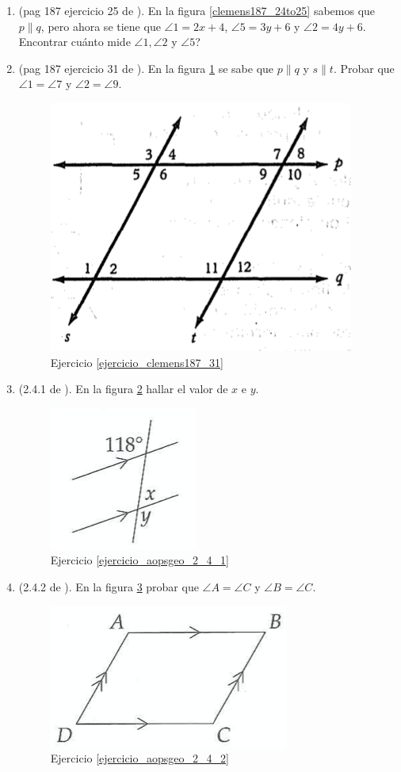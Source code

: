 \begin{enumerate}
	\item  \label{ejercicio_clemens187_24} (pag 187 ejercicio 25 de \cite{clemens}). En la figura \ref{clemens187_24to25} sabemos que $p\parallel q$, pero ahora se tiene que $\angle 1 =2x+4$, $\angle 5= 3y+6$ y $\angle 2 = 4y+6$. Encontrar cuánto mide $\angle 1,\angle 2$ y $\angle 5$?
	
	\item  \label{ejercicio_clemens187_31} (pag 187 ejercicio 31 de \cite{clemens}). En la figura \ref{clemens187_31} se sabe que $p\parallel q$ y $s\parallel t$. Probar que $\angle 1 = \angle 7$ y $\angle 2 = \angle 9$.
	\begin{figure}[H]
		\centering
		\includegraphics[width=0.4\linewidth]{Geometria/imgs/clemens187_31}
		\caption{Ejercicio \ref{ejercicio_clemens187_31}}
		\label{clemens187_31}
	\end{figure}
	
	\item  \label{ejercicio_aopsgeo_2_4_1} (2.4.1 de \cite{Aops_Geometria}). En la figura \ref{aopsgeo_2_4_1} hallar el valor de $x$ e $y$.
	\begin{figure}[H]
		\centering
		\includegraphics[width=0.4\linewidth]{Geometria/imgs/aopsgeo_2_4_1}
		\caption{Ejercicio \ref{ejercicio_aopsgeo_2_4_1}}
		\label{aopsgeo_2_4_1}
	\end{figure}
	
	\item  \label{ejercicio_aopsgeo_2_4_2} (2.4.2 de \cite{Aops_Geometria}). En la figura \ref{aopsgeo_2_4_2} probar que $\angle A =\angle C$ y $\angle B = \angle C$.
	\begin{figure}[H]
		\centering
		\includegraphics[width=0.4\linewidth]{Geometria/imgs/aopsgeo_2_4_2}
		\caption{Ejercicio \ref{ejercicio_aopsgeo_2_4_2}}
		\label{aopsgeo_2_4_2}
	\end{figure}
	

\end{enumerate}
